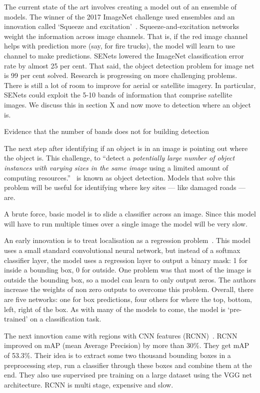 \documentclass[12pt, a4paper, oneside, headinclude, footinclude]{article}
\begin{document}
The current state of the art involves creating a model out of an ensemble of
models. The winner of the 2017 ImageNet challenge used ensembles and an
innovation called `Squeeze and excitation'~\cite{wmw}. Squeeze-and-excitation
networks weight the information across image channels. That is, if the red
image channel helps with prediction more (say, for fire trucks), the model
will learn to use channel to make predictions. SENets lowered the ImageNet
classification error rate by almost 25 per cent.  That said, the object
detection problem for image net is 99 per cent solved.  Research is
progressing on more challenging problems. There is still a lot of room to
improve for aerial or satellite imagery. In particular, SENets could exploit
the 5-10 bands of information that comprise satellite images. We discuss this
in section X and now move to detection where an object is.

Evidence that the number of bands does not for building detection~\cite{2017Panchromatic}

The next step after identifying if an object is in an image is pointing out
where the object is. This challenge, to ``detect a \textit{potentially large
number of object instances with varying sizes in the same image} using a
limited amount of computing resources.''~\cite[Their emphasis]{NIPS2013_5207}
is known as object detection. Models that solve this problem will be useful for identifying
where key sites --- like damaged roads --- are.

A brute force, basic model is to slide a classifier across an image. Since
this model will have to run multiple times over a single image the model will
be very slow. 

An early innovation is to treat localisation as a regression
problem~\cite{NIPS2013_5207}. This model uses a small standard convolutional
neural network, but instead of a softmax classifier layer, the model uses a
regression layer to output a binary mask: 1 for inside a bounding box, 0 for
outside. One problem was that most of the image is outside the bounding box,
so a model can learn to only output zeros. The authors increase the weights of
non zero outputs to overcome this problem. Overall, there are five networks:
one for box predictions, four others for where the {top, bottom, left, right}
of the box. As with many of the models to come, the model is `pre-trained' on
a classification task. 

The next innovtion came with regions with CNN features
(RCNN)~\cite{Girshick2014, Girshick2015}. RCNN improved on mAP (mean Average
Precision) by more than 30\%. They get mAP of 53.3\%. Their idea is to extract
some two thousand bounding boxes in a preprocessing step, run a classifier
through these boxes and combine them at the end. They also use supervised pre
training on a large dataset using the VGG net architecture. RCNN is multi
stage, expensive and slow. 
\end{document}
